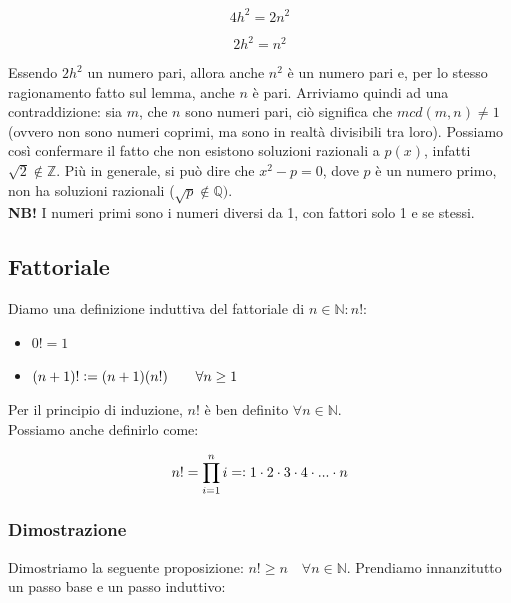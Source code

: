 \documentclass{article}
\begin{document}
\begin{equation*}
    4h^2 = 2n^2
\end{equation*}

\begin{equation*}
    2h^2 = n^2
\end{equation*}

\noindent Essendo $2h^2$ un numero pari, allora anche $n^2$ è un numero pari e, per lo stesso ragionamento fatto sul lemma, anche $n$ è pari. Arriviamo quindi ad una contraddizione: sia $m$, che $n$ sono numeri pari, ciò significa che $mcd(m,n) \neq 1$ (ovvero non sono numeri coprimi, ma sono in realtà divisibili tra loro). Possiamo così confermare il fatto che non esistono soluzioni razionali a $p(x)$, infatti $\sqrt{2} \notin \mathbb{Z}$. Più in generale, si può dire che $x^2 - p = 0$, dove $p$ è un numero primo, non ha soluzioni razionali ($\sqrt{p} \notin \mathbb{Q})$.\\

\noindent\textbf{NB!} I numeri primi sono i numeri diversi da 1, con fattori solo 1 e se stessi.

\subsection{Fattoriale}
Diamo una definizione induttiva del fattoriale di $n \in \mathbb{N}: n!$: 

\begin{itemize}
    \item $0! = 1$
    \item $(n+1)! \vcentcolon = (n+1)(n!) \qquad \forall n \geq 1$
\end{itemize}

\noindent Per il principio di induzione, $n!$ è ben definito $\forall n \in \mathbb{N}$. \\

\noindent Possiamo anche definirlo come:

\begin{equation*}
    n! = \prod_{i=1}^n i = \vcentcolon 1 \cdot 2 \cdot 3 \cdot 4 \cdot ... \cdot n
\end{equation*}

\subsubsection{Dimostrazione}
Dimostriamo la seguente proposizione: $n! \geq n \quad \forall n \in \mathbb{N}$. Prendiamo innanzitutto un passo base e un passo induttivo:
\end{document}

